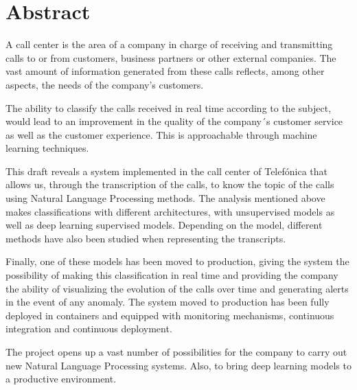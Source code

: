 \chapter*{Abstract}

A call center is the area of a company in charge of receiving and transmitting calls to or from customers, business partners or other external companies. The vast amount of information generated from these calls reflects, among other aspects, the needs of the company's customers.


The ability to classify the calls received in real time according to the subject, would lead to an improvement in the quality of the company´s customer service as well as the customer experience. This is approachable through machine learning techniques.


This draft reveals a system implemented in the call center of Telefónica that allows us, through the transcription of the calls, to know the topic of the calls using Natural Language Processing methods. The analysis mentioned above makes classifications with different architectures, with unsupervised models as well as deep learning supervised models. Depending on the model, different methods have also been studied when representing the transcripts.


Finally, one of these models has been moved to production, giving the system the possibility of making this classification in real time and providing the company the ability of visualizing the evolution of the calls over time and generating alerts in the event of any anomaly. The system moved to production has been fully deployed in containers and equipped with monitoring mechanisms, continuous integration and continuous deployment.


The project opens up a vast number of possibilities for the company to carry out new Natural Language Processing systems. Also, to bring deep learning models to a productive environment. 




\onehalfspacing


